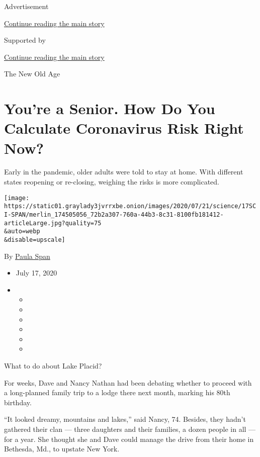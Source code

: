 Advertisement

\protect\hyperlink{after-top}{Continue reading the main story}

Supported by

\protect\hyperlink{after-sponsor}{Continue reading the main story}

The New Old Age

\hypertarget{youre-a-senior-how-do-you-calculate-coronavirus-risk-right-now}{%
\section{You're a Senior. How Do You Calculate Coronavirus Risk Right
Now?}\label{youre-a-senior-how-do-you-calculate-coronavirus-risk-right-now}}

Early in the pandemic, older adults were told to stay at home. With
different states reopening or re-closing, weighing the risks is more
complicated.

\texttt{[image: https://static01.graylady3jvrrxbe.onion/images/2020/07/21/science/17SCI-SPAN/merlin\_174505056\_72b2a307-760a-44b3-8c31-8100fb181412-articleLarge.jpg?quality=75\\\&auto=webp\\\&disable=upscale]}

By \href{https://www.nytimes3xbfgragh.onion/by/paula-span}{Paula Span}

\begin{itemize}
\item
  July 17, 2020
\item
  \begin{itemize}
  \item
  \item
  \item
  \item
  \item
  \item
  \end{itemize}
\end{itemize}

What to do about Lake Placid?

For weeks, Dave and Nancy Nathan had been debating whether to proceed
with a long-planned family trip to a lodge there next month, marking his
80th birthday.

``It looked dreamy, mountains and lakes,'' said Nancy, 74. Besides, they
hadn't gathered their clan --- three daughters and their families, a
dozen people in all --- for a year. She thought she and Dave could
manage the drive from their home in Bethesda, Md., to upstate New York.

